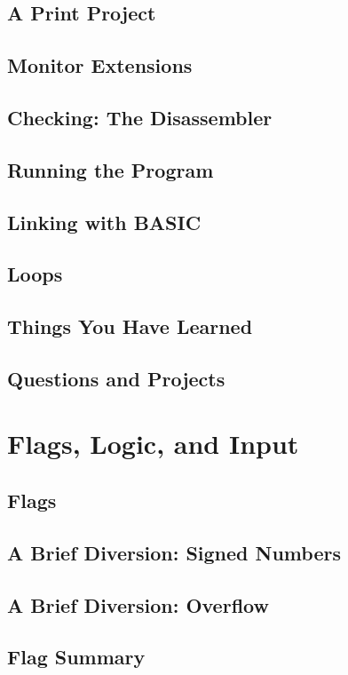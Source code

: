 \documentclass[11pt,a4paper,titlepage]{memoir}
\begin{document}
\section{A Print Project}
\blindtext
\section{Monitor Extensions}
\blindtext
\section{Checking: The Disassembler}
\blindtext
\section{Running the Program}
\blindtext
\section{Linking with BASIC}
\blindtext
\section{Loops}
\blindtext
\section{Things You Have Learned}
\blindtext
\section{Questions and Projects}
\blindtext
\chapter{Flags, Logic, and Input}
\blindtext
\newpage
\section{Flags} 
\blindtext
\section{A Brief Diversion: Signed Numbers} 
\blindtext
\section{A Brief Diversion: Overflow} 
\blindtext
\section{Flag Summary} 
\blindtext
\end{document}
